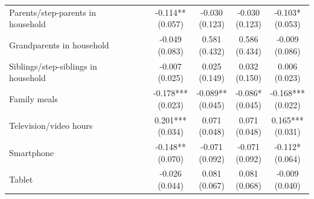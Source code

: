 \begin{table}[!htbp]
\begin{tabular}{p{}cccccc}
\\
Parents/step-parents in household &  &  & \shortstack[c]{-0.114** \\[-0.35ex] (0.057)} & \shortstack[c]{-0.030 \\[-0.35ex] (0.123)} & \shortstack[c]{-0.030 \\[-0.35ex] (0.123)} & \shortstack[c]{-0.103* \\[-0.35ex] (0.053)}
\\
Grandparents in household &  &  & \shortstack[c]{-0.049 \\[-0.35ex] (0.083)} & \shortstack[c]{0.581 \\[-0.35ex] (0.432)} & \shortstack[c]{0.586 \\[-0.35ex] (0.434)} & \shortstack[c]{-0.009 \\[-0.35ex] (0.086)}
\\
Siblings/step-siblings in household &  &  & \shortstack[c]{-0.007 \\[-0.35ex] (0.025)} & \shortstack[c]{0.025 \\[-0.35ex] (0.149)} & \shortstack[c]{0.032 \\[-0.35ex] (0.150)} & \shortstack[c]{0.006 \\[-0.35ex] (0.023)}
\\
Family meals &  &  & \shortstack[c]{-0.178*** \\[-0.35ex] (0.023)} & \shortstack[c]{-0.089** \\[-0.35ex] (0.045)} & \shortstack[c]{-0.086* \\[-0.35ex] (0.045)} & \shortstack[c]{-0.168*** \\[-0.35ex] (0.022)}
\\
Television/video hours &  &  & \shortstack[c]{0.201*** \\[-0.35ex] (0.034)} & \shortstack[c]{0.071 \\[-0.35ex] (0.048)} & \shortstack[c]{0.071 \\[-0.35ex] (0.048)} & \shortstack[c]{0.165*** \\[-0.35ex] (0.031)}
\\
Smartphone &  &  & \shortstack[c]{-0.148** \\[-0.35ex] (0.070)} & \shortstack[c]{-0.071 \\[-0.35ex] (0.092)} & \shortstack[c]{-0.071 \\[-0.35ex] (0.092)} & \shortstack[c]{-0.112* \\[-0.35ex] (0.064)}
\\
Tablet &  &  & \shortstack[c]{-0.026 \\[-0.35ex] (0.044)} & \shortstack[c]{0.081 \\[-0.35ex] (0.067)} & \shortstack[c]{0.081 \\[-0.35ex] (0.068)} & \shortstack[c]{-0.009 \\[-0.35ex] (0.040)}

\end{tabular}
\end{table}
